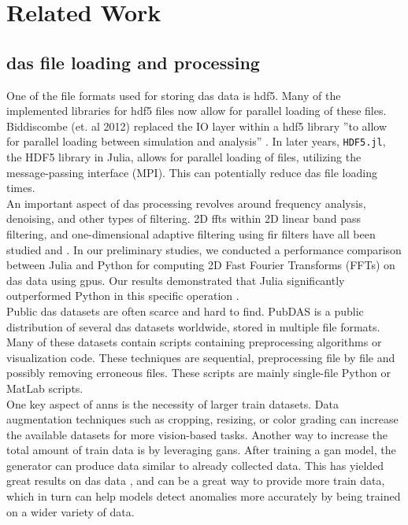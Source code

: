 \section{Related Work}
\label{relwork:anomaly}


\subsection{\acrshort{das} file loading and processing}

One of the file formats used for storing \acrshort{das} data is \acrshort{hdf5}. Many of the implemented libraries for \acrshort{hdf5} files now allow for parallel loading of these files. Biddiscombe (et. al 2012) replaced the IO layer within a \acrshort{hdf5} library ''to allow for parallel loading between simulation and analysis'' \cite{biddiscombe2012parallel}. In later years, \texttt{HDF5.jl}, the HDF5 library in Julia, allows for parallel loading of files, utilizing the message-passing interface (MPI). This can potentially reduce \acrshort{das} file loading times. \\ 

An important aspect of \acrshort{das} processing revolves around frequency analysis, denoising, and other types of filtering. 2D \acrfull{fft}s within 2D linear band pass filtering, and one-dimensional adaptive filtering using \acrfull{fir} filters have all been studied and \cite{daspreproc}. In our preliminary studies, we conducted a performance comparison between Julia and Python for computing 2D Fast Fourier Transforms (FFTs) on \acrshort{das} data using \acrshort{gpu}s. Our results demonstrated that Julia significantly outperformed Python in this specific operation \cite{projthesis}. \\

Public \acrshort{das} datasets are often scarce and hard to find. PubDAS \cite{spica2023pubdas} is a public distribution of several \acrshort{das} datasets worldwide, stored in multiple file formats. Many of these datasets contain scripts containing preprocessing algorithms or visualization code. These techniques are sequential, preprocessing file by file and possibly removing erroneous files. These scripts are mainly single-file Python or MatLab scripts. \\ 

One key aspect of \acrshort{ann}s is the necessity of larger train datasets. Data augmentation techniques such as cropping, resizing, or color grading can increase the available datasets for more vision-based tasks. Another way to increase the total amount of train data is by leveraging \acrshort{gan}s. After training a \acrshort{gan} model, the generator can produce data similar to already collected data. This has yielded great results on \acrshort{das} data \cite{Shiloh:19}, and can be a great way to provide more train data, which in turn can help models detect anomalies more accurately by being trained on a wider variety of data. \\

